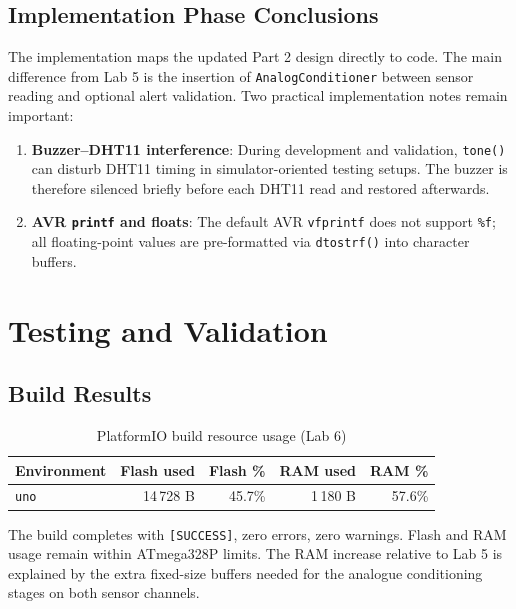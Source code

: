 \documentclass[12pt]{article}
\begin{document}
\subsection{Implementation Phase Conclusions}
\hspace{0.8cm} The implementation maps the updated Part 2 design directly to code. The main difference from Lab 5 is the insertion of \texttt{AnalogConditioner} between sensor reading and optional alert validation. Two practical implementation notes remain important:

\begin{enumerate}
    \item \textbf{Buzzer--DHT11 interference}: During development and validation, \texttt{tone()} can disturb DHT11 timing in simulator-oriented testing setups. The buzzer is therefore silenced briefly before each DHT11 read and restored afterwards.
    \item \textbf{AVR \texttt{printf} and floats}: The default AVR \texttt{vfprintf} does not support \texttt{\%f}; all floating-point values are pre-formatted via \texttt{dtostrf()} into character buffers.
\end{enumerate}

\section{Testing and Validation}

\subsection{Build Results}

\begin{table}[H]
\centering
\begin{tabular}{lrrrr}
\toprule
\textbf{Environment} & \textbf{Flash used} & \textbf{Flash \%} & \textbf{RAM used} & \textbf{RAM \%} \\
\midrule
\texttt{uno} & 14\,728 B & 45.7\% & 1\,180 B & 57.6\% \\
\bottomrule
\end{tabular}
\caption{PlatformIO build resource usage (Lab 6)}
\label{tab:build}
\end{table}

The build completes with \texttt{[SUCCESS]}, zero errors, zero warnings. Flash and RAM usage remain within ATmega328P limits. The RAM increase relative to Lab 5 is explained by the extra fixed-size buffers needed for the analogue conditioning stages on both sensor channels.
\end{document}
